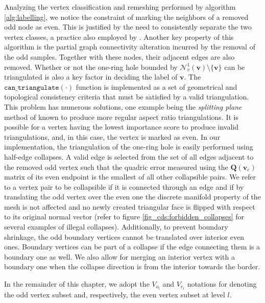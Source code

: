 \documentclass[graybox]{svmult}
\begin{document}
Analyzing the vertex classification and remeshing performed by algorithm \ref{alg:labelling}, we notice the constraint of marking the neighbors of a removed odd node as even. This is justified by the need to consistently separate the two vertex classes,  a practice also employed by \cite{Guskov1999}. Another key property of this algorithm is the partial graph connectivity alteration incurred by the removal of the odd samples. Together with these nodes, their adjacent edges are also removed. Whether or not the one-ring hole bounded by $\mathcal{N}_v^1(\mathbf{v})\setminus\{\mathbf{v}\}$ can be triangulated is also a key factor in deciding the label of $\mathbf{v}$. The $\mathtt{can\_triangulate}(\cdot)$ function is implemented as a set of geometrical and topological consistency criteria that must be satisfied by a valid triangulation. This problem has numerous solutions, one example being the \emph{splitting plane} method of \cite{Schroeder1992} known to produce more regular aspect ratio triangulations. It is possible for a vertex having the lowest importance score to produce invalid triangulations, and, in this case, the vertex is marked as even. In our implementation, the triangulation of the one-ring hole is easily performed using half-edge collapses. A valid edge is selected from the set of all edges adjacent to the removed odd vertex such that the quadric error measured using the $\mathbf{Q}(\mathbf{v}_e)$ matrix of its even endpoint is the smallest of all other collapsible pairs. We refer to a vertex pair to be collapsible if it is connected through an edge and if by translating the odd vertex over the even one the discrete manifold property of the mesh is not affected and no newly created triangular face is flipped with respect to its original normal vector (refer to figure \ref{fig_cds:forbidden_collapses} for several examples of illegal collapses). Additionally, to prevent boundary shrinkage, the odd boundary vertices cannot be translated over interior even ones. Boundary vertices can be part of a collapse if the edge connecting them is a boundary one as well. We also allow for merging an interior vertex with a boundary one when the collapse direction is from the interior towards the border.

In the remainder of this chapter, we adopt the $V_{o_l}$ and $V_{e_l}$ notations for denoting the odd vertex subset  and, respectively, the even vertex subset at level $l$.
\end{document}
